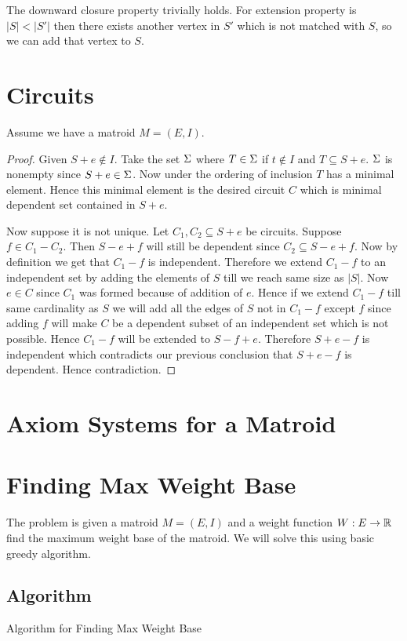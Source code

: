 The downward closure property trivially holds. For extension property is $|S|<|S'|$ then there exists another vertex in $S'$ which is not matched with $S$, so we can add that vertex to $S$. 

\section{Circuits}
Assume we have a matroid $M=(E,I)$. 

\begin{proof}
	Given $S+e\notin I$. Take the set $\Sigma$ where $T\in \Sigma$ if $t\notin I$ and $T\subseteq S+e$. $\Sigma$ is nonempty since $S+e\in \Sigma$. Now under the ordering of inclusion $T$ has a minimal element. Hence this minimal element is the desired circuit $C$ which is minimal dependent set contained in $S+e$.
	
	Now suppose it is not unique. Let $C_1,C_2\subseteq S+e$ be circuits. Suppose $f\in C_1-C_2$. Then $S-e+f$ will still be dependent since $C_2\subseteq S-e+f$. Now by definition we get that $C_1-f$ is independent. Therefore we extend $C_1-f$ to an independent set by adding the elements of $S$ till we reach same size as $|S|$. Now $e\in C$ since $C_1$ was formed because of addition of $e$. Hence if we extend $C_1-f$ till same cardinality as $S$ we will add all the edges of $S$ not in $C_1-f$ except $f$ since adding $f$ will make $C$ be a dependent subset of an independent set which is not possible. Hence $C_1-f$ will be extended to $S-f+e$. Therefore $S+e-f$ is independent which contradicts our previous conclusion that $S+e-f$ is dependent. Hence contradiction.
\end{proof}

\section{Axiom Systems for a Matroid}



\section{Finding Max Weight Base}
The problem is given a matroid $M=(E,I)$ and a weight function $W:E\to \mathbb{R}$ find the maximum weight base of the matroid. We will solve this using basic greedy algorithm. 
\subsection{Algorithm}
\begin{algorithm}
	\DontPrintSemicolon
	\caption{Algorithm for Finding Max Weight Base}
\end{algorithm}
